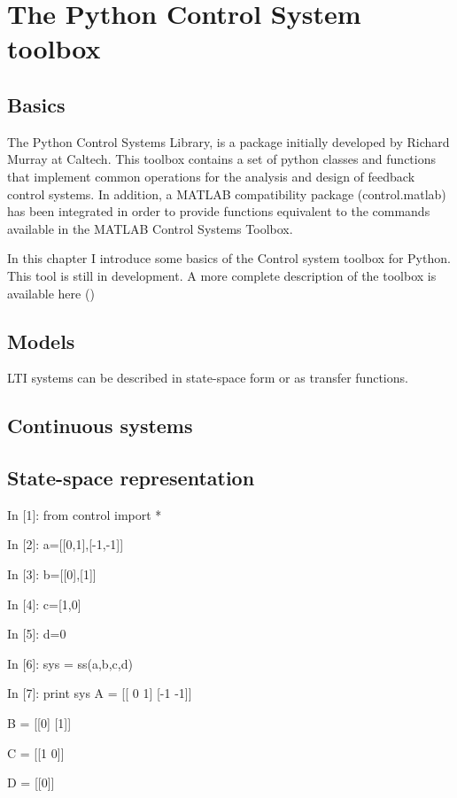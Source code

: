 \newpage

\chapter{The Python Control System toolbox}
\section{Basics}

The Python Control Systems Library, is a package initially developed by 
Richard Murray at Caltech. This toolbox  contains a set of python classes 
and functions that implement common operations for the analysis and design of 
feedback control systems. 
In addition, a MATLAB compatibility package (control.matlab) has been 
integrated in order to provide functions equivalent to the commands available 
in the MATLAB Control Systems Toolbox.

In this chapter I introduce some basics of the Control system toolbox for Python. This tool is still in development. A more complete description of the toolbox is available here (\cite{MANUALTBX})

\section{Models}

LTI systems can be described in state-space form or as transfer functions.

\section{Continuous systems}
\section{State-space representation}
\begin{code}
In [1]: from control import *

In [2]: a=[[0,1],[-1,-1]]

In [3]: b=[[0],[1]]

In [4]: c=[1,0]

In [5]: d=0

In [6]: sys = ss(a,b,c,d)

In [7]: print sys
A = [[ 0  1]
 [-1 -1]]

B = [[0]
 [1]]

C = [[1 0]]

D = [[0]]
\end{code}

